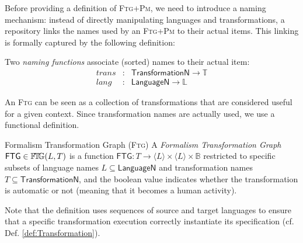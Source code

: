 Before providing a definition of \textsc{Ftg+Pm}, we need to introduce a naming 
mechanism: instead of directly manipulating languages and transformations, a 
repository links the names used by an \textsc{Ftg+Pm} to their actual items. 
This linking is formally captured by the following definition:



\begin{Definition}[Naming]
   Two \emph{naming functions} associate (sorted) names to their actual item:
   \begin{displaymath}
      \begin{array}{rcl}
         trans &\colon& \mathsf{TransformationN} \to \mathbb{T}\\
         lang  &\colon& \mathsf{LanguageN} \to \mathbb{L}
      \end{array}
   \end{displaymath}
\end{Definition}

An \textsc{Ftg} can be seen as a collection of transformations that are 
considered useful for a given context. Since transformation names are actually 
used, we use a functional definition.
\begin{Definition}{Formalism Transformation Graph (\textsc{Ftg})}
   A \emph{Formalism Transformation Graph} $\mathsf{FTG} \in \mathbb{F}\!\mathbb{T}\!\mathbb{G}(L, T)$ is a 
function  $\mathsf{FTG} \colon T \to \langle L \rangle \times \langle L \rangle 
\times \mathbb{B}$ restricted to specific subsets of language names $L 
\subseteq \mathsf{LanguageN}$ and transformation names $T\subseteq 
\mathsf{TransformationN}$, and the boolean value indicates whether the 
transformation is automatic or not (meaning that it becomes a human activity).
\end{Definition}
Note that the definition uses sequences of source and target languages to 
ensure that a specific transformation execution correctly instantiate its 
specification (cf. Def. \ref{def:Transformation}).

